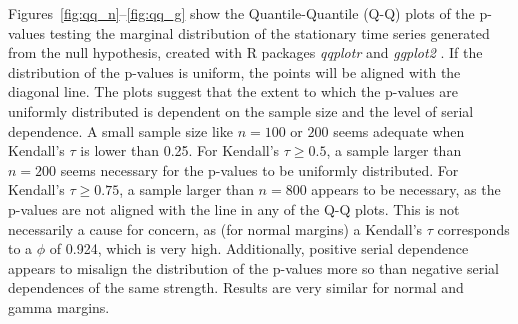 \documentclass[12pt]{article}
\begin{document}
Figures~\ref{fig:qq_n}--\ref{fig:qq_g} show the Quantile-Quantile (Q-Q)
plots of the p-values testing the marginal distribution of the stationary time
series generated from the null hypothesis, created with R packages
\textsl{qqplotr} and \textsl{ggplot2} \citep{qqplotr, ggplot2}. If the
distribution of the p-values is uniform, the points will be aligned with the
diagonal line. The plots suggest that the extent to which the p-values are
uniformly distributed is dependent on the sample size and the level of serial
dependence.
A small sample size like $n = 100$ or $200$ seems adequate when Kendall's
$\tau$ is lower than 0.25. For Kendall's $\tau \geq 0.5$, a sample larger than
$n = 200$ seems necessary for the p-values to be uniformly distributed. For
Kendall's $\tau \geq 0.75$, a sample larger than $n = 800$ appears to be
necessary, as the p-values are not aligned with the line in any of the Q-Q
plots. This is not necessarily a cause for concern, as (for normal margins)
a Kendall's $\tau$ corresponds to a $\phi$ of 0.924, which is very high.
Additionally, positive serial dependence appears to misalign the distribution
of the p-values more so than negative serial dependences of the same strength.
Results are very similar for normal and gamma margins.
\end{document}
